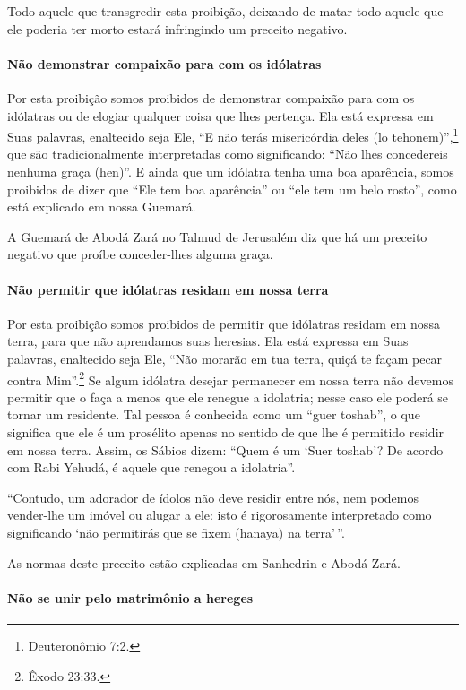 Todo aquele que transgredir esta proibição, deixando de matar todo
aquele que ele poderia ter morto estará infringindo um preceito
negativo.

\paragraph{Não demonstrar compaixão para com os idólatras}

Por esta proibição somos proibidos de demonstrar compaixão para com os
idólatras ou de elogiar qualquer coisa que lhes pertença. Ela está
expressa em Suas palavras, enaltecido seja Ele, ``E não terás
misericórdia deles (lo tehonem)'',\footnote{Deuteronômio 7:2.} que são
tradicionalmente interpretadas como significando: ``Não lhes
concedereis nenhuma graça (hen)''. E ainda que um idólatra tenha uma boa
aparência, somos proibidos de dizer que ``Ele tem boa aparência'' ou
``ele tem um belo rosto'', como está explicado em nossa Guemará.

A Guemará de Abodá Zará no Talmud de Jerusalém diz que há um preceito
negativo que proíbe conceder-lhes alguma graça.

\paragraph{Não permitir que idólatras residam em nossa terra}

Por esta proibição somos proibidos de permitir que idólatras residam em
nossa terra, para que não aprendamos suas heresias. Ela está expressa em
Suas palavras, enaltecido seja Ele, ``Não morarão em tua terra, quiçá te
façam pecar contra Mim''.\footnote{Êxodo 23:33.} Se algum idólatra desejar
permanecer em nossa terra não devemos permitir que o faça a menos que
ele renegue a idolatria; nesse caso ele poderá se tornar um residente.
Tal pessoa é conhecida como um ``guer toshab'', o que significa que ele
é um prosélito apenas no sentido de que lhe é permitido residir em
nossa terra. Assim, os Sábios dizem: ``Quem é um `Suer toshab'? De
acordo com Rabi Yehudá, é aquele que renegou a idolatria''.

``Contudo, um adorador de ídolos não deve residir entre nós, nem podemos
vender-lhe um imóvel ou alugar a ele: isto é rigorosamente interpretado
como significando `não permitirás que se fixem (hanaya) na terra'\,''.

As normas deste preceito estão explicadas em Sanhedrin e Abodá Zará.

\paragraph{Não se unir pelo matrimônio a hereges}


